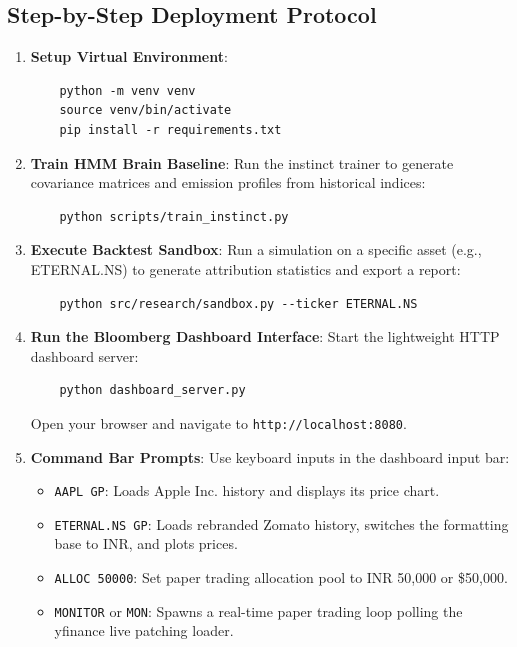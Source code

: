 \documentclass[11pt,a4paper]{article}
\begin{document}
\subsection{Step-by-Step Deployment Protocol}

\begin{enumerate}
    \item \textbf{Setup Virtual Environment}:
    \begin{verbatim}
    python -m venv venv
    source venv/bin/activate
    pip install -r requirements.txt
    \end{verbatim}
    
    \item \textbf{Train HMM Brain Baseline}:
    Run the instinct trainer to generate covariance matrices and emission profiles from historical indices:
    \begin{verbatim}
    python scripts/train_instinct.py
    \end{verbatim}
    
    \item \textbf{Execute Backtest Sandbox}:
    Run a simulation on a specific asset (e.g., ETERNAL.NS) to generate attribution statistics and export a report:
    \begin{verbatim}
    python src/research/sandbox.py --ticker ETERNAL.NS
    \end{verbatim}
    
    \item \textbf{Run the Bloomberg Dashboard Interface}:
    Start the lightweight HTTP dashboard server:
    \begin{verbatim}
    python dashboard_server.py
    \end{verbatim}
    Open your browser and navigate to \texttt{http://localhost:8080}.
    
    \item \textbf{Command Bar Prompts}:
    Use keyboard inputs in the dashboard input bar:
    \begin{itemize}
        \item \texttt{AAPL GP}: Loads Apple Inc. history and displays its price chart.
        \item \texttt{ETERNAL.NS GP}: Loads rebranded Zomato history, switches the formatting base to INR, and plots prices.
        \item \texttt{ALLOC 50000}: Set paper trading allocation pool to INR 50,000 or \$50,000.
        \item \texttt{MONITOR} or \texttt{MON}: Spawns a real-time paper trading loop polling the yfinance live patching loader.
    \end{itemize}
\end{enumerate}
\end{document}
